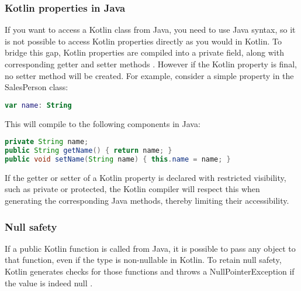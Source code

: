 \documentclass[a4paper,11pt]{article}
\begin{document}
\subsubsection{Kotlin properties in Java}
If you want to access a Kotlin class from Java, you need to use Java syntax, so it is not possible to access Kotlin properties directly as you would in Kotlin. To bridge this gap, Kotlin properties are compiled into a private field, along with corresponding getter and setter methods \cite{interop-properties}. However if the Kotlin property is final, no setter method will be created. For example, consider a simple property in the SalesPerson class:
\begin{lstlisting}[language=Kotlin]
var name: String
\end{lstlisting}
This will compile to the following components in Java:
\begin{lstlisting}[language=Java]
private String name;
public String getName() { return name; }
public void setName(String name) { this.name = name; }
\end{lstlisting}
If the getter or setter of a Kotlin property is declared with restricted visibility, such as private or protected, the Kotlin compiler will respect this when generating the corresponding Java methods, thereby limiting their accessibility.

\subsubsection{Null safety}
If a public Kotlin function is called from Java, it is possible to pass any object to that function, even if the type is non-nullable in Kotlin. To retain null safety, Kotlin generates checks for those functions and throws a NullPointerException if the value is indeed null \cite{interop-java-null-safety}.
\end{document}
